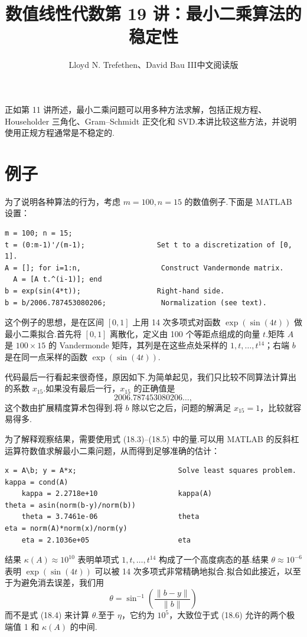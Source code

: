 \documentclass[UTF8,fontset=none,12pt]{ctexart}
\title{数值线性代数\quad 第 19 讲：最小二乘算法的稳定性}
\author{Lloyd N. Trefethen、David Bau III\quad 中文阅读版}
\date{}
\theoremstyle{definition}
\begin{document}
\maketitle
\pagestyle{plain}

正如第 11 讲所述，最小二乘问题可以用多种方法求解，包括正规方程、Householder 三角化、Gram--Schmidt 正交化和 SVD.本讲比较这些方法，并说明使用正规方程通常是不稳定的.

\section*{例子}

为了说明各种算法的行为，考虑 $m=100,n=15$ 的数值例子.下面是 MATLAB 设置：

\begin{verbatim}
m = 100; n = 15;
t = (0:m-1)'/(m-1);                 Set t to a discretization of [0, 1].
A = []; for i=1:n,                   Construct Vandermonde matrix.
  A = [A t.^(i-1)]; end
b = exp(sin(4*t));                  Right-hand side.
b = b/2006.787453080206;             Normalization (see text).
\end{verbatim}

这个例子的思想，是在区间 $[0,1]$ 上用 14 次多项式对函数 $\exp(\sin(4t))$ 做最小二乘拟合.首先将 $[0,1]$ 离散化，定义由 100 个等距点组成的向量 $t$.矩阵 $A$ 是 $100\times15$ 的 Vandermonde 矩阵，其列是在这些点处采样的 $1,t,\ldots,t^{14}$；右端 $b$ 是在同一点采样的函数 $\exp(\sin(4t))$.

代码最后一行看起来很奇怪，原因如下.为简单起见，我们只比较不同算法计算出的系数 $x_{15}$.如果没有最后一行，$x_{15}$ 的正确值是
\[
2006.787453080206\ldots,
\]
这个数由扩展精度算术包得到.将 $b$ 除以它之后，问题的解满足 $x_{15}=1$，比较就容易得多.

为了解释观察结果，需要使用式 (18.3)--(18.5) 中的量.可以用 MATLAB 的反斜杠运算符数值求解最小二乘问题，从而得到足够准确的估计：

\begin{verbatim}
x = A\b; y = A*x;                        Solve least squares problem.
kappa = cond(A)
    kappa = 2.2718e+10                   kappa(A)
theta = asin(norm(b-y)/norm(b))
    theta = 3.7461e-06                   theta
eta = norm(A)*norm(x)/norm(y)
    eta = 2.1036e+05                     eta
\end{verbatim}

结果 $\kappa(A)\approx10^{10}$ 表明单项式 $1,t,\ldots,t^{14}$ 构成了一个高度病态的基.结果 $\theta\approx10^{-6}$ 表明 $\exp(\sin(4t))$ 可以被 14 次多项式非常精确地拟合.拟合如此接近，以至于为避免消去误差，我们用
\[
\theta=\sin^{-1}\left(\frac{\|b-y\|}{\|b\|}\right)
\]
而不是式 (18.4) 来计算 $\theta$.至于 $\eta$，它约为 $10^5$，大致位于式 (18.6) 允许的两个极端值 1 和 $\kappa(A)$ 的中间.
\end{document}
